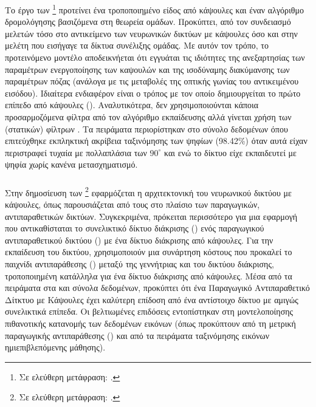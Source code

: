 \subsubsection{}

Το έργο των  \footnote{Σε ελεύθερη μετάφραση: .} \cite{lenssen2018group} προτείνει ένα τροποποιημένο είδος από κάψουλες και έναν αλγόριθμο δρομολόγησης βασιζόμενα στη θεωρεία ομάδων. Προκύπτει, από τον συνδειασμό μελετών τόσο στο αντικείμενο των νευρωνικών δικτύων με κάψουλες όσο και στην μελέτη που εισήγαγε τα δίκτυα συνέλιξης ομάδας\cite{cohen2016group}. Με αυτόν τον τρόπο, το προτεινόμενο μοντέλο αποδεικνήεται ότι εγγυάται τις ιδιότητες της ανεξαρτησίας των παραμέτρων ενεργοποίησης των καψουλών και της ισοδύναμης διακύμανσης των παραμέτρων πόζας (ανάλογα με τις μεταβολές της οπτικής γωνίας του αντικειμένου εισόδου). Ιδιαίτερα ενδιαφέρον είναι ο τρόπος με τον οποίο δημιουργείται το πρώτο επίπεδο από κάψουλες (). Αναλυτικότερα, δεν χρησιμοποιούνται κάποια προσαρμοζόμενα φίλτρα από τον αλγόριθμο εκπαίδευσης αλλά γίνεται χρήση των (στατικών) φίλτρων . Τα πειράματα περιορίστηκαν στο σύνολο δεδομένων  όπου επιτεύχθηκε εκπληκτική ακρίβεια ταξινόμησης των ψηφίων (98.42\%) όταν αυτά είχαν περιστραφεί τυχαία με πολλαπλάσια των $90^{\circ}$ και ενώ το δίκτυο είχε εκπαιδευτεί με ψηφία χωρίς κανένα μετασχηματισμό.


\subsubsection{}

Στην δημοσίευση των  \footnote{Σε ελεύθερη μετάφραση: .}\cite{jaiswal2018capsulegan} εφαρμόζεται η αρχιτεκτονική του νευρωνικού δικτύου με κάψουλες, όπως παρουσιάζεται από τους \cite{sabour2017dynamic} στο πλαίσιο των παραγωγικών, αντιπαραθετικών δικτύων. Συγκεκριμένα, πρόκειται περισσότερο για μια εφαρμογή που αντικαθίσταται το συνελικτικό δίκτυο διάκρισης () ενός παραγωγικού αντιπαραθετικού δικτύου () με ένα δίκτυο διάκρισης από κάψουλες. Για την εκπαίδευση του δικτύου, χρησιμοποιούν μια συνάρτηση κόστους που προκαλεί το παιχνίδι αντιπαράθεσης () μεταξύ της γεννήτριας και του δικτύου διάκρισης, τροποποιημένη κατάλληλα για ένα δίκτυο διάκρισης από κάψουλες. Μέσα από τα πειράματα στα  και  σύνολα δεδομένων, προκύπτει ότι ένα Παραγωγικό Αντιπαραθετικό Δίτκτυο με Κάψουλες έχει καλύτερη επίδοση από ένα αντίστοιχο δίκτυο με αμιγώς συνελικτικά επίπεδα. Οι βελτιωμένες επιδόσεις εντοπίστηκαν στη μοντελοποίησης πιθανοτικής κατανομής των δεδομένων εικόνων (όπως προκύπτουν από τη μετρική παραγωγικής αντιπαράθεσης ()\cite{im2016generative} και από τα πειράματα ταξινόμησης εικόνων ημι\textendash επιβλεπόμενης μάθησης).

